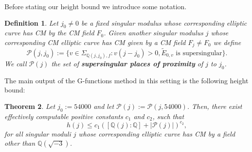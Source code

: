 \documentclass[12pt,twoside,a4paper]{article}
\theoremstyle{plain}%
\newtheorem{theorem}{Theorem}[section] %
\newtheorem{definition}[theorem]{Definition} %
\newcommand{\Q}{\mathbb{Q}}
\newcommand{\CP}{\mathcal{P}}
\begin{document}
Before stating our height bound we introduce some notation.
\begin{definition}\label{defnproblematic}
	Let $j_0\neq 0$ be a fixed singular modulus whose corresponding elliptic curve has CM by the CM field $F_0$. Given another singular modulus $j$ whose corresponding CM elliptic curve has CM given by a CM field $F_j\neq F_0$ we define
	 \begin{equation}\CP(j,j_0):=\{ v\in \Sigma_{\Q(j,j_0),f}: v(j-j_0)>0, \tilde{E}_{0,v}\text{ is supersingular}\}.
		\end{equation}We call $\CP(j)$ the set of \textbf{supersingular places of proximity} of $j$ to $j_0$.
	\end{definition}

The main output of the G-functions method in this setting is the following height bound:
\begin{theorem}\label{heightboundcm}Let $j_0:=54000$ and let $\CP(j):=\CP(j,54000)$. Then, there exist effectively computable positive constants $c_1$ and $c_2$, such that
\begin{equation}\label{eq:htboundmain}h(j)\leq c_1 ([\Q(j):\Q] +|\CP(j)| )^{c_2},\end{equation}
for all singular moduli $j$ whose corresponding elliptic curve has CM by a field other than $\Q(\sqrt{-3})$.\end{theorem}
\end{document}
